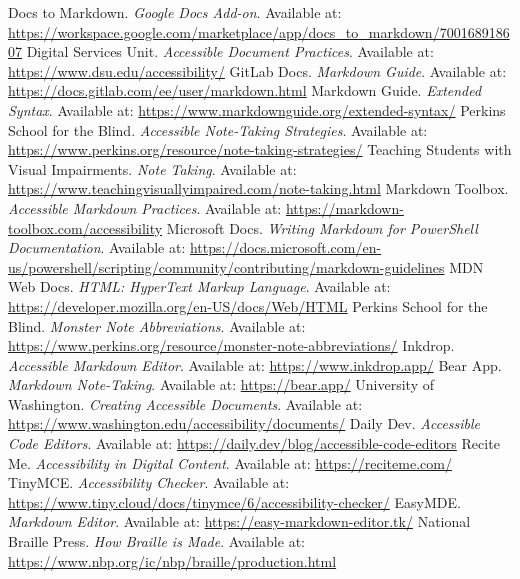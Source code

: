 \begin{thebibliography}{99}
 Docs to Markdown. \textit{Google Docs Add-on}. Available at: \url{https://workspace.google.com/marketplace/app/docs_to_markdown/700168918607}
 Digital Services Unit. \textit{Accessible Document Practices}. Available at: \url{https://www.dsu.edu/accessibility/}
 GitLab Docs. \textit{Markdown Guide}. Available at: \url{https://docs.gitlab.com/ee/user/markdown.html}
 Markdown Guide. \textit{Extended Syntax}. Available at: \url{https://www.markdownguide.org/extended-syntax/}
 Perkins School for the Blind. \textit{Accessible Note-Taking Strategies}. Available at: \url{https://www.perkins.org/resource/note-taking-strategies/}
 Teaching Students with Visual Impairments. \textit{Note Taking}. Available at: \url{https://www.teachingvisuallyimpaired.com/note-taking.html}
 Markdown Toolbox. \textit{Accessible Markdown Practices}. Available at: \url{https://markdown-toolbox.com/accessibility}
 Microsoft Docs. \textit{Writing Markdown for PowerShell Documentation}. Available at: \url{https://docs.microsoft.com/en-us/powershell/scripting/community/contributing/markdown-guidelines}
 MDN Web Docs. \textit{HTML: HyperText Markup Language}. Available at: \url{https://developer.mozilla.org/en-US/docs/Web/HTML}
 Perkins School for the Blind. \textit{Monster Note Abbreviations}. Available at: \url{https://www.perkins.org/resource/monster-note-abbreviations/}
 Inkdrop. \textit{Accessible Markdown Editor}. Available at: \url{https://www.inkdrop.app/}
 Bear App. \textit{Markdown Note-Taking}. Available at: \url{https://bear.app/}
 University of Washington. \textit{Creating Accessible Documents}. Available at: \url{https://www.washington.edu/accessibility/documents/}
 Daily Dev. \textit{Accessible Code Editors}. Available at: \url{https://daily.dev/blog/accessible-code-editors}
 Recite Me. \textit{Accessibility in Digital Content}. Available at: \url{https://reciteme.com/}
 TinyMCE. \textit{Accessibility Checker}. Available at: \url{https://www.tiny.cloud/docs/tinymce/6/accessibility-checker/}
 EasyMDE. \textit{Markdown Editor}. Available at: \url{https://easy-markdown-editor.tk/}
 National Braille Press. \textit{How Braille is Made}. Available at: \url{https://www.nbp.org/ic/nbp/braille/production.html}

\end{thebibliography}
